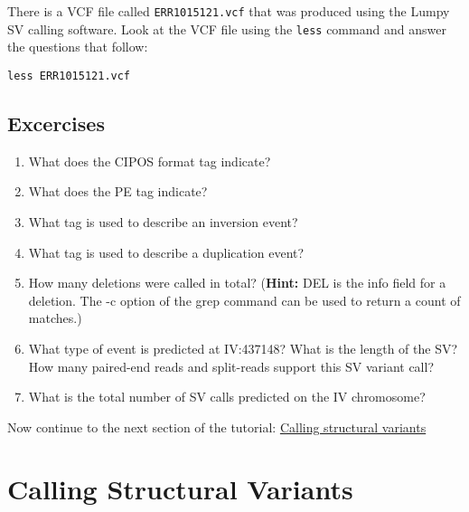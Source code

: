 \documentclass[11pt]{article}
\makeatletter
\providecommand{\tightlist}{%
      \setlength{\itemsep}{0pt}\setlength{\parskip}{0pt}}
\newcommand{\boxspacing}{\kern\kvtcb@left@rule\kern\kvtcb@boxsep}
\newcommand{\prompt}[4]{
        {\ttfamily\llap{{\color{blue}\LARGE\faKeyboardO\hspace{3pt}#4}}\vspace{-\baselineskip}}
    }
\makeatother
\begin{document}
    There is a VCF file called \texttt{ERR1015121.vcf} that was produced
using the Lumpy SV calling software. Look at the VCF file using the
\texttt{less} command and answer the questions that follow:

    \begin{tcolorbox}[breakable, size=fbox, boxrule=1pt, pad at break*=1mm,colback=cellbackground, colframe=cellborder]
\prompt{In}{incolor}{ }{\boxspacing}
\begin{Verbatim}[commandchars=\\\{\}]
less ERR1015121.vcf
\end{Verbatim}
\end{tcolorbox}

    \hypertarget{excercises}{%
\subsection{Excercises}\label{excercises}}

\begin{enumerate}
\def\labelenumi{\arabic{enumi}.}
\tightlist
\item
  What does the CIPOS format tag indicate?
\item
  What does the PE tag indicate?
\item
  What tag is used to describe an inversion event?
\item
  What tag is used to describe a duplication event?
\item
  How many deletions were called in total? (\textbf{Hint:} DEL is the
  info field for a deletion. The -c option of the grep command can be
  used to return a count of matches.)
\item
  What type of event is predicted at IV:437148? What is the length of
  the SV? How many paired-end reads and split-reads support this SV
  variant call?
\item
  What is the total number of SV calls predicted on the IV chromosome?
\end{enumerate}

    Now continue to the next section of the tutorial:
\href{sv-calling.ipynb}{Calling structural variants}





\newpage





    \hypertarget{calling-structural-variants}{%
\section{Calling Structural
Variants}\label{calling-structural-variants}}
\end{document}
